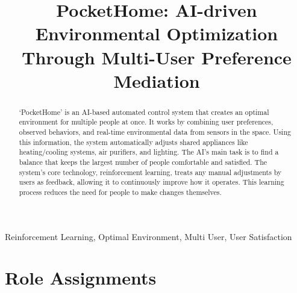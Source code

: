 \documentclass[conference]{IEEEtran}
\begin{document}
\title{PocketHome: AI-driven Environmental Optimization Through Multi-User Preference Mediation}

\author{
    \and
    \and
}

\maketitle

\begin{abstract}
‘PocketHome’ is an AI-based automated control system that creates an optimal environment for multiple people at once. It works by combining user preferences, observed behaviors, and real-time environmental data from sensors in the space. Using this information, the system automatically adjusts shared appliances like heating/cooling systems, air purifiers, and lighting. The AI's main task is to find a balance that keeps the largest number of people comfortable and satisfied. The system's core technology, reinforcement learning, treats any manual adjustments by users as feedback, allowing it to continuously improve how it operates. This learning process reduces the need for people to make changes themselves.
\end{abstract}

\begin{IEEEkeywords}
Reinforcement Learning, Optimal Environment, Multi User, User Satisfaction
\end{IEEEkeywords}


\section{Role Assignments}
\end{document}
